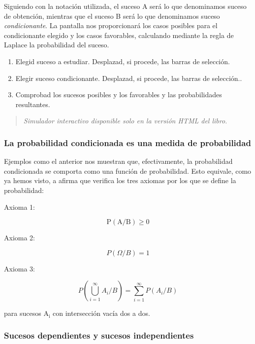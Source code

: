 \documentclass[
]{article}
\providecommand{\tightlist}{%
  \setlength{\itemsep}{0pt}\setlength{\parskip}{0pt}}
\begin{document}
Siguiendo con la notación utilizada, el suceso A será lo que
denominamos suceso de obtención, mientras que el suceso B será lo que
denominamos suceso \emph{condicionante}. La pantalla nos proporcionará los casos
posibles para el condicionante elegido y los casos favorables,
calculando mediante la regla de Laplace la probabilidad del suceso.

\begin{enumerate}
\def\labelenumi{\arabic{enumi})}
\tightlist
\item
  Elegid suceso a estudiar. Desplazad, si procede, las barras de selección.
\item
  Elegir suceso condicionante. Desplazad, si procede, las barras de selección..
\item
  Comprobad los sucesos posibles y los favorables y las probabilidades resultantes.
\end{enumerate}

\begin{quote}
\emph{Simulador interactivo disponible solo en la versión HTML del libro.}
\end{quote}

\subsubsection{La probabilidad condicionada es una medida de probabilidad}\label{la-probabilidad-condicionada-es-una-medida-de-probabilidad}

Ejemplos como el anterior nos muestran que, efectivamente, la probabilidad condicionada se comporta como una función de probabilidad. Esto equivale, como ya hemos visto, a afirma que verifica los tres axiomas por los que se define la probabilidad:

Axioma 1:

\[
\mathrm{P}(\mathrm{A} / \mathrm{B}) \geq 0
\]

Axioma 2:

\[
P(\Omega / B)=1
\]

Axioma 3:

\[
P\left(\bigcup_{i=1}^{\infty} A_{i} / B\right)=\sum_{i=1}^{\infty} P\left(A_{i} / B\right)
\]

para sucesos \(\mathrm{A}_{\mathrm{i}}\) con intersección vacía dos a dos.

\subsubsection{Sucesos dependientes y sucesos independientes}\label{sucesos-dependientes-y-sucesos-independientes}
\end{document}

